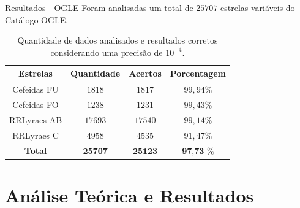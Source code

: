 \documentclass{beamer}
\begin{document}
\begin{frame}{Resultados - OGLE}
Foram analisadas um total de $25707$ estrelas variáveis do Catálogo OGLE.
\begin{table}
\begin{center}
\caption{Quantidade de dados analisados e resultados corretos considerando uma precisão de $10^{-4}$.}
\begin{tabular}{c|c|c|c}
\hline
Estrelas & Quantidade & Acertos  & Porcentagem \\
\hline
Cefeidas FU & $1818$ & $1817$ & $99,94 \%$ \\
Cefeidas FO & $1238$ & $1231$ & $99,43 \%$ \\
RRLyraes AB& $17693$ & $17540$ & $99,14 \%$ \\
RRLyraes C& $4958$ & $4535$ & $91,47 \%$ \\
\hline
\textbf{Total} & $\textbf{25707}$ & $\textbf{25123}$ & $\textbf{97,73 \%}$ \\
\hline
\end{tabular}
\label{tab:resultados}
\end{center}
\end{table}

\end{frame}

\section{Análise Teórica e Resultados}
\end{document}
